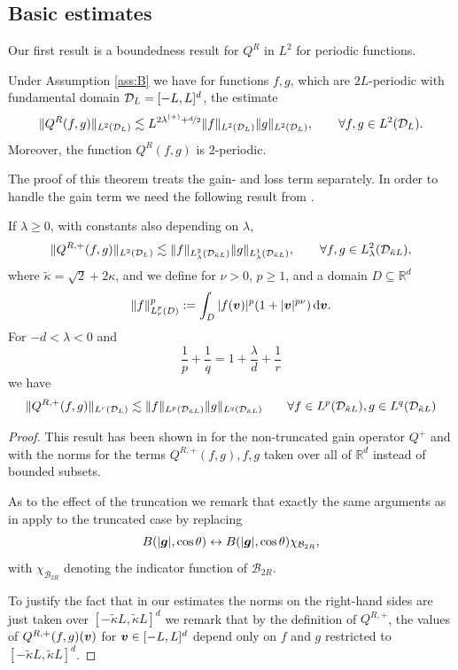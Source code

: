 \subsection{Basic estimates}

Our first result is a boundedness result for $Q^R$ in $L^2$ for periodic
functions. 
\begin{theorem}\label{thm:L2bound}
  Under Assumption \ref{ass:B} we have for functions $f,g$, which are $2L$-periodic
  with fundamental domain $\mathcal{D}_L=[-L,L]^d$, the estimate
    \[
        \|Q^R(f,g)\|_{L^2(\mathcal{D}_L)}\lesssim L^{2\lambda^{(+)}+\nicefrac{d}{2}}
                \|f\|_{L^2(\mathcal{D}_L)}\|g\|_{L^2(\mathcal{D}_L)}, \qquad \forall f,g\in L^2(\mathcal{D}_L).
    \]
    Moreover, the function $Q^R(f,g)$ is $2$-periodic. 
\end{theorem}
The proof of this theorem treats the gain- and loss term separately.  In order
to handle the gain term we need the following result from \cite[Theorems 1,
2]{Alonso10}.  
\begin{theorem}\label{thm:L2boundGain}
    If $\lambda \geq 0$, with constants also depending on $\lambda$,
    \[
        \|Q^{R,+}(f,g)\|_{L^2(\mathcal{D}_L)} \lesssim
                \|f\|_{L^2_\lambda(\mathcal{D}_{\tilde{\kappa}L})}
                \|g\|_{L^1_\lambda(\mathcal{D}_{\tilde{\kappa}L})},\qquad \forall
                f,g\in L^2_\lambda(\mathcal{D}_{\tilde{\kappa}L}),
    \]
    where $\tilde{\kappa}=\sqrt{2}+2\kappa$, and we define for $\nu>0$, $p\geq 1$, and a domain $D\subseteq
    \mathbb{R}^d$
    \[
        \|f\|_{L^p_\nu(D)}^p:=\int_{D} |f({\bm v})|^p(1 + |{\bm v}|^{p\nu})\,\mathrm{d}{\bm v}. 
    \]
    For $-d <\lambda <0$ and 
    \[
        \frac{1}{p} + \frac{1}{q} = 1 + \frac{\lambda}{d}+\frac{1}{r} 
    \]
    we have
    \[
        \|Q^{R,+}(f,g)\|_{L^r(\mathcal{D}_L)} \lesssim
        \|f\|_{L^p(\mathcal{D}_{\tilde{\kappa}L})}\|g\|_{L^q(\mathcal{D}_{\tilde{\kappa}L})}\qquad \forall f\in
        L^p(\mathcal{D}_{\tilde{\kappa}L}), g\in L^q(\mathcal{D}_{\tilde{\kappa}L})
    \]
\end{theorem}
\begin{proof}
    This result has been shown in \cite[Theorems 1, 2]{Alonso10} for the
    non-truncated gain operator $Q^+$ and with the norms for the terms
    $Q^{R,+}(f,g), f, g$ taken over all of $\mathbb{R}^d$ instead of bounded subsets.

    As to the effect of the truncation we remark that exactly the same
    arguments as in \cite{Alonso10} apply to the truncated case by replacing
    \[
        B(|{\bm g}|,\cos\theta)\leftrightarrow 
                B(|{\bm g}|,\cos\theta)\chi_{\mathcal{B}_{2R}},
    \]
    with $\chi_{\mathcal{B}_{2R}}$ denoting the indicator function of
    $\mathcal{B}_{2R}$.

    To justify the fact that in our estimates the norms on the right-hand sides
    are just taken over $[-\tilde{\kappa}L,\tilde{\kappa}L]^d$ we remark that by the definition of
    $Q^{R,+}$, the values of $Q^{R,+}(f,g)({\bm v})$ for ${\bm v}\in [-L,L]^d$ depend only
    on $f$ and $g$ restricted to $[-\tilde{\kappa}L,\tilde{\kappa}L]^d$.
\end{proof}
